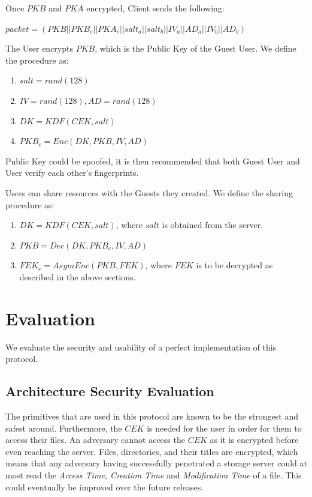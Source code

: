 \documentclass[a4paper,9pt,twoside]{article}
\begin{document}
Once $PKB$ and $PKA$ encrypted, Client sends the following:

\begin{center}
$packet=(PKB || PKB_e || PKA_e || salt_a || salt_b || IV_a || AD_a || IV_b || AD_b)$
\end{center}

The User encrypts $PKB$, which is the Public Key of the Guest User. We define the procedure as:

\begin{enumerate}
\itemsep0em
\item $salt=rand(128)$
\item $IV=rand(128), AD=rand(128)$
\item $DK=KDF(CEK, salt)$
\item $PKB_e=Enc(DK, PKB, IV, AD)$
\end{enumerate}

Public Key could be spoofed, it is then recommended that both Guest User and User verify each other's fingerprints.

Users can share resources with the Guests they created. We define the sharing 
procedure as:

\begin{enumerate}
\itemsep0em
\item $DK=KDF(CEK, salt)$, where $salt$ is obtained from the server.
\item $PKB=Dec(DK, PKB_e, IV, AD)$
\item $FEK_e=AsymEnc(PKB, FEK)$, where $FEK$ is to be decrypted as described 
in the above sections.
\end{enumerate}

\section{Evaluation}

We evaluate the security and usability of a perfect implementation of this protocol.

\subsection{Architecture Security Evaluation}

The primitives that are used in this protocol are known 
to be the strongest and safest around. Furthermore, 
the $CEK$ is needed for the user in order for them to access 
their files. An adversary cannot access the $CEK$ as it is encrypted 
before even reaching the server. Files, directories, and their titles 
are encrypted, which means that any adversary having successfully 
penetrated a storage server could at most read the \emph{Access Time, 
Creation Time} and \emph{Modification Time} of a file. This could eventually 
be improved over the future releases.
\end{document}
